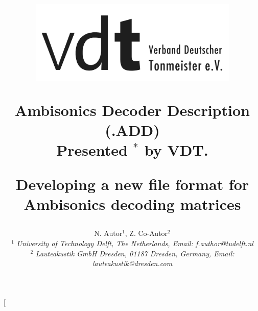 \documentclass[a4paper, 10pt, twocolumn]{article}
\begin{document}
\fancyhf{} %

\chead{\underline{\sffamily\large\textcolor{gray}{5th International Conference on Spatial Audio ICSA, September 2019}}}
\renewcommand{\headrulewidth}{0pt}
\rhead{}
\renewcommand{\headrulewidth}{0pt}
\rhead{}


\date{}											%

\title{
\vspace{-5mm}%
\mbox{\includegraphics[height=4cm]{VDT}}
%
\vspace{7mm}%
%
\begin{center}
\textbf{\Huge Ambisonics Decoder Description (.ADD)}\\
{ Presented  $^*$ by VDT.}
\end{center}
\vspace{10mm}%
\begin{center}
\textbf\mdseries Developing a new file format for Ambisonics decoding matrices
\end{center}
%
\mbox{}\vspace{-11mm}
%
}

\author{ %
%
N. Autor$^1$, Z. Co-Autor$^2$\\
%
$^1$ \textit{\large %
University of Technology Delft, The Netherlands, Email: f.author@tudelft.nl
}\\
%
$^2$ \emph{\large %
Lauteakustik GmbH Dresden, 01187 Dresden, Germany, Email: lauteakustik@dresden.com
}
%
}
%

\twocolumn[
\maketitle
\thispagestyle{fancy}
%
\end{document}
